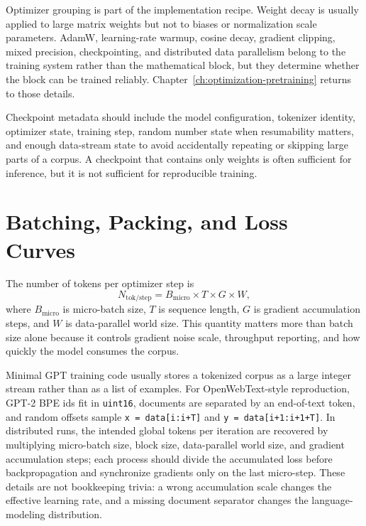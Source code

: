 Optimizer grouping is part of the implementation recipe. Weight decay is usually applied to large matrix weights but not to biases or normalization scale parameters. AdamW, learning-rate warmup, cosine decay, gradient clipping, mixed precision, checkpointing, and distributed data parallelism belong to the training system rather than the mathematical block, but they determine whether the block can be trained reliably. Chapter~\ref{ch:optimization-pretraining} returns to those details.

Checkpoint metadata should include the model configuration, tokenizer identity, optimizer state, training step, random number state when resumability matters, and enough data-stream state to avoid accidentally repeating or skipping large parts of a corpus. A checkpoint that contains only weights is often sufficient for inference, but it is not sufficient for reproducible training.

\section{Batching, Packing, and Loss Curves}
\label{sec:batching-packing-loss-curves}

The number of tokens per optimizer step is
\begin{equation}
  N_{\mathrm{tok/step}} =
  B_{\mathrm{micro}} \times T \times G \times W,
\end{equation}
where $B_{\mathrm{micro}}$ is micro-batch size, $T$ is sequence length, $G$ is gradient accumulation steps, and $W$ is data-parallel world size. This quantity matters more than batch size alone because it controls gradient noise scale, throughput reporting, and how quickly the model consumes the corpus.

Minimal GPT training code usually stores a tokenized corpus as a large integer stream rather than as a list of examples. For OpenWebText-style reproduction, GPT-2 BPE ids fit in \texttt{uint16}, documents are separated by an end-of-text token, and random offsets sample \texttt{x = data[i:i+T]} and \texttt{y = data[i+1:i+1+T]}. In distributed runs, the intended global tokens per iteration are recovered by multiplying micro-batch size, block size, data-parallel world size, and gradient accumulation steps; each process should divide the accumulated loss before backpropagation and synchronize gradients only on the last micro-step. These details are not bookkeeping trivia: a wrong accumulation scale changes the effective learning rate, and a missing document separator changes the language-modeling distribution.

